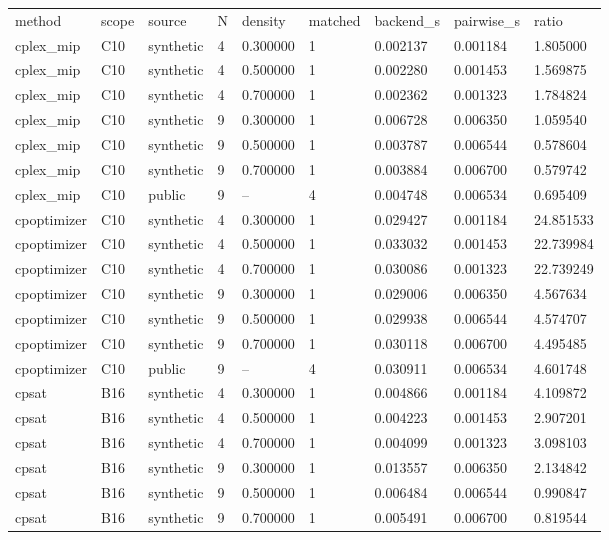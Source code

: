 \begin{tabular}{lllllllll}
\hline
method & scope & source & N & density & matched & backend\_s & pairwise\_s & ratio \\
cplex\_mip & C10 & synthetic & 4 & 0.300000 & 1 & 0.002137 & 0.001184 & 1.805000 \\
cplex\_mip & C10 & synthetic & 4 & 0.500000 & 1 & 0.002280 & 0.001453 & 1.569875 \\
cplex\_mip & C10 & synthetic & 4 & 0.700000 & 1 & 0.002362 & 0.001323 & 1.784824 \\
cplex\_mip & C10 & synthetic & 9 & 0.300000 & 1 & 0.006728 & 0.006350 & 1.059540 \\
cplex\_mip & C10 & synthetic & 9 & 0.500000 & 1 & 0.003787 & 0.006544 & 0.578604 \\
cplex\_mip & C10 & synthetic & 9 & 0.700000 & 1 & 0.003884 & 0.006700 & 0.579742 \\
cplex\_mip & C10 & public & 9 & -- & 4 & 0.004748 & 0.006534 & 0.695409 \\
cpoptimizer & C10 & synthetic & 4 & 0.300000 & 1 & 0.029427 & 0.001184 & 24.851533 \\
cpoptimizer & C10 & synthetic & 4 & 0.500000 & 1 & 0.033032 & 0.001453 & 22.739984 \\
cpoptimizer & C10 & synthetic & 4 & 0.700000 & 1 & 0.030086 & 0.001323 & 22.739249 \\
cpoptimizer & C10 & synthetic & 9 & 0.300000 & 1 & 0.029006 & 0.006350 & 4.567634 \\
cpoptimizer & C10 & synthetic & 9 & 0.500000 & 1 & 0.029938 & 0.006544 & 4.574707 \\
cpoptimizer & C10 & synthetic & 9 & 0.700000 & 1 & 0.030118 & 0.006700 & 4.495485 \\
cpoptimizer & C10 & public & 9 & -- & 4 & 0.030911 & 0.006534 & 4.601748 \\
cpsat & B16 & synthetic & 4 & 0.300000 & 1 & 0.004866 & 0.001184 & 4.109872 \\
cpsat & B16 & synthetic & 4 & 0.500000 & 1 & 0.004223 & 0.001453 & 2.907201 \\
cpsat & B16 & synthetic & 4 & 0.700000 & 1 & 0.004099 & 0.001323 & 3.098103 \\
cpsat & B16 & synthetic & 9 & 0.300000 & 1 & 0.013557 & 0.006350 & 2.134842 \\
cpsat & B16 & synthetic & 9 & 0.500000 & 1 & 0.006484 & 0.006544 & 0.990847 \\
cpsat & B16 & synthetic & 9 & 0.700000 & 1 & 0.005491 & 0.006700 & 0.819544 \\

\end{tabular}
